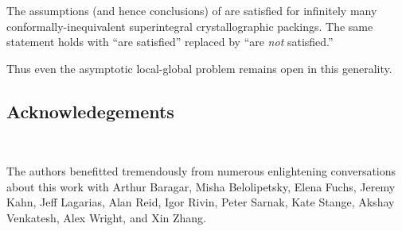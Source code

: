 \documentclass[12pt,reqno]{amsart}
\begin{document}
\begin{thm}
The assumptions (and hence conclusions) of  are satisfied for infinitely many conformally-inequivalent superintegral crystallographic packings. 
The same statement holds with ``are satisfied'' replaced by ``are \emph{not} satisfied.''
\end{thm}

Thus even the asymptotic local-global problem remains %
open
 in this generality.




\subsection*{Acknowledegements}\

The authors benefitted
tremendously from numerous 
enlightening conversations about this work with
 Arthur Baragar, Misha Belolipetsky, Elena Fuchs, Jeremy Kahn, Jeff Lagarias, Alan Reid, Igor Rivin, Peter Sarnak, Kate Stange, Akshay Venkatesh,  Alex Wright, and Xin Zhang.





\end{document}
